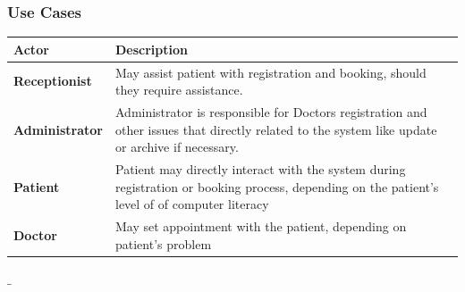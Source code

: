 \documentclass[11 pt]{article}
\begin{document}
\subsubsection{Use Cases}
\begin{tabular}{|p{3cm}|p{9cm}|}
\hline
\textbf{Actor} & \textbf{Description}\\
\hline
\textbf{Receptionist} & May assist patient with registration and booking, should they require assistance.\\
\hline
\textbf{Administrator}& Administrator is responsible for Doctors registration and other issues that directly related to the system like update or archive if necessary.\\
\hline
\textbf{Patient}& Patient may directly interact with the system during registration or booking process, depending on the patient's level of of computer literacy\\
\hline
\textbf{Doctor}& May set appointment with the patient, depending on patient's problem \\
\hline

\end{tabular}
$\_$
\\\\\\
\end{document}
